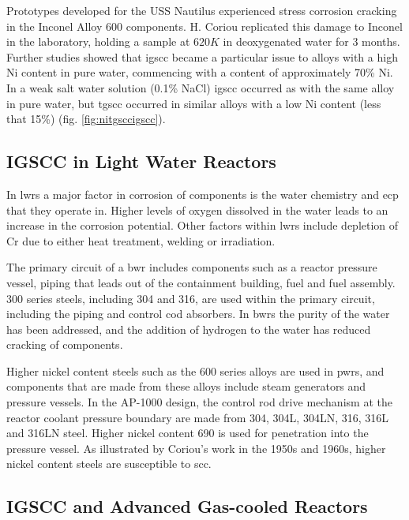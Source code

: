 Prototypes developed for the USS Nautilus experienced stress corrosion cracking in the Inconel Alloy 600 components.  H. Coriou replicated this damage to Inconel in the laboratory, holding a sample at $620K$ in deoxygenated water for 3 months\cite{staehlecoriou}.  Further studies showed that \acrshort{igscc} became a particular issue to alloys with a high Ni content in pure water, commencing with a content of approximately 70\% Ni.  In a weak salt water solution (0.1\% NaCl) \acrshort{igscc} occurred as with the same alloy in pure water, but \acrshort{tgscc} occurred in similar alloys with a low Ni content (less that 15\%) (fig. \ref{fig:nitgsccigscc}).


\FloatBarrier

\subsection{IGSCC in Light Water Reactors}

In \acrshort{lwr}s a major factor in corrosion of components is the water chemistry and \acrlong{ecp} that they operate in.  Higher levels of oxygen dissolved in the water leads to an increase in the corrosion potential\cite{wasstrucaustenitic}.  Other factors within \acrshort{lwr}s include depletion of Cr due to either heat treatment, welding or irradiation.

The primary circuit of a \acrshort{bwr} includes components such as a reactor pressure vessel, piping that leads out of the containment building, fuel and fuel assembly.  300 series steels, including 304 and 316, are used within the primary circuit, including the piping and control cod absorbers.  In \acrshort{bwr}s the purity of the water has been addressed, and the addition of hydrogen to the water has reduced cracking of components\cite{staehlecoriou}.  

Higher nickel content steels such as the 600 series alloys are used in \acrshort{pwr}s, and components that are made from these alloys include steam generators and pressure vessels.  In the AP-1000 design, the control rod drive mechanism at the reactor coolant pressure boundary are made from 304, 304L, 304LN, 316, 316L and 316LN steel.  Higher nickel content 690 is used for penetration into the pressure vessel\cite{ap1000dcd}.  As illustrated by Coriou's work in the 1950s and 1960s, higher nickel content steels are susceptible to \acrlong{scc}.

\FloatBarrier
\subsection{IGSCC and Advanced Gas-cooled Reactors}

